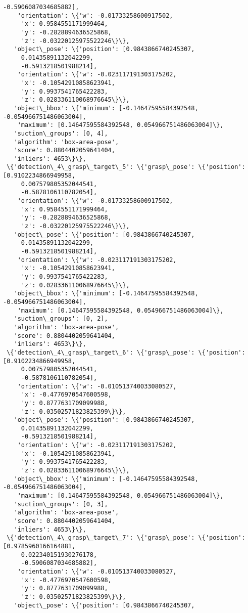 \documentclass[11pt]{article}
\begin{document}
\begin{tcolorbox}[breakable, size=fbox, boxrule=.5pt, pad at break*=1mm, opacityfill=0]
\begin{Verbatim}[commandchars=\\\{\}]
     -0.5906087034685882],
    'orientation': \{'w': -0.01733258600917502,
     'x': 0.9584551171999464,
     'y': -0.2828894636525868,
     'z': -0.03220125975522246\}\},
   'object\_pose': \{'position': [0.9843866740245307,
     0.01435891132042299,
     -0.5913218501988214],
    'orientation': \{'w': -0.023117191303175202,
     'x': -0.10542910858623941,
     'y': 0.9937541765422283,
     'z': 0.028336110068976645\}\},
   'object\_bbox': \{'minimum': [-0.14647595584392548, -0.054966751486063004],
    'maximum': [0.14647595584392548, 0.054966751486063004]\},
   'suction\_groups': [0, 4],
   'algorithm': 'box-area-pose',
   'score': 0.8804402059641404,
   'inliers': 4653\}\},
 \{'detection\_4\_grasp\_target\_5': \{'grasp\_pose': \{'position': [0.9102234866949958,
     0.007579805352044541,
     -0.5878106110782054],
    'orientation': \{'w': -0.01733258600917502,
     'x': 0.9584551171999464,
     'y': -0.2828894636525868,
     'z': -0.03220125975522246\}\},
   'object\_pose': \{'position': [0.9843866740245307,
     0.01435891132042299,
     -0.5913218501988214],
    'orientation': \{'w': -0.023117191303175202,
     'x': -0.10542910858623941,
     'y': 0.9937541765422283,
     'z': 0.028336110068976645\}\},
   'object\_bbox': \{'minimum': [-0.14647595584392548, -0.054966751486063004],
    'maximum': [0.14647595584392548, 0.054966751486063004]\},
   'suction\_groups': [0, 2],
   'algorithm': 'box-area-pose',
   'score': 0.8804402059641404,
   'inliers': 4653\}\},
 \{'detection\_4\_grasp\_target\_6': \{'grasp\_pose': \{'position': [0.9102234866949958,
     0.007579805352044541,
     -0.5878106110782054],
    'orientation': \{'w': -0.010513740033080527,
     'x': -0.4776970547600598,
     'y': 0.8777631709099988,
     'z': 0.03502571823825399\}\},
   'object\_pose': \{'position': [0.9843866740245307,
     0.01435891132042299,
     -0.5913218501988214],
    'orientation': \{'w': -0.023117191303175202,
     'x': -0.10542910858623941,
     'y': 0.9937541765422283,
     'z': 0.028336110068976645\}\},
   'object\_bbox': \{'minimum': [-0.14647595584392548, -0.054966751486063004],
    'maximum': [0.14647595584392548, 0.054966751486063004]\},
   'suction\_groups': [0, 3],
   'algorithm': 'box-area-pose',
   'score': 0.8804402059641404,
   'inliers': 4653\}\},
 \{'detection\_4\_grasp\_target\_7': \{'grasp\_pose': \{'position': [0.9785960166164881,
     0.022340151930276178,
     -0.5906087034685882],
    'orientation': \{'w': -0.010513740033080527,
     'x': -0.4776970547600598,
     'y': 0.8777631709099988,
     'z': 0.03502571823825399\}\},
   'object\_pose': \{'position': [0.9843866740245307,

\end{Verbatim}
\end{tcolorbox}
\end{document}
